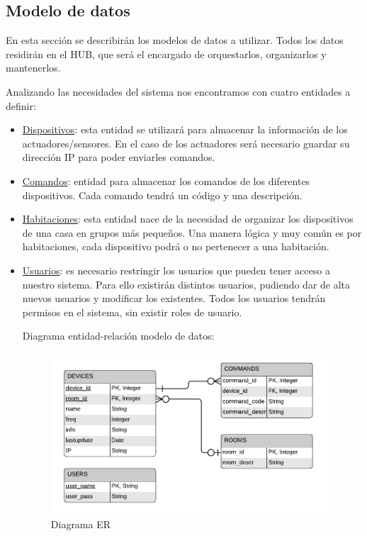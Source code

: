 \subsection{Modelo de datos}
En esta sección se describirán los modelos de datos a utilizar. Todos los datos residirán en el HUB, que será el encargado de orquestarlos,
organizarlos y mantenerlos.
\par
Analizando las necesidades del sistema nos encontramos con cuatro entidades a definir:
\begin{itemize}
\item \underline{Dispositivos}: esta entidad se utilizará para almacenar la información de los actuadores/sensores. En el caso de los actuadores
será necesario guardar su dirección IP para poder enviarles comandos.
\item \underline{Comandos}: entidad para almacenar los comandos de los diferentes dispositivos. Cada comando tendrá un código y una descripción.
\item \underline{Habitaciones}: esta entidad nace de la necesidad de organizar los dispositivos de una casa en grupos más pequeños. Una manera lógica 
y muy común es por habitaciones, cada dispositivo podrá o no pertenecer a una habitación.
\item \underline{Usuarios}: es necesario restringir los usuarios que pueden tener acceso a nuestro sistema. Para ello existirán distintos usuarios, pudiendo
dar de alta nuevos usuarios y modificar los existentes. Todos los usuarios tendrán permisos en el sistema, sin existir roles de usuario. 
\par
Diagrama entidad-relación modelo de datos:
\begin{figure}[H]
\centering
\includegraphics[width=6.00in]{images/er_brimo.png}
\caption{Diagrama ER}
\label{fig:diagrama-er}
\end{figure}

\end{itemize}
